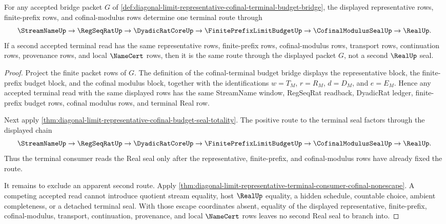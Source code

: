 \begin{theorem}
\label{thm:diagonal-limit-representative-cofinal-terminal-route-determinacy}
For any accepted bridge packet $G$ of \autoref{def:diagonal-limit-representative-cofinal-terminal-budget-bridge}, the displayed representative rows, finite-prefix rows, and cofinal-modulus rows determine one terminal route through
$$
\StreamNameUp \to \RegSeqRatUp \to \DyadicRatCoreUp \to \FinitePrefixLimitBudgetUp \to \CofinalModulusSealUp \to \RealUp.
$$
If a second accepted terminal read has the same representative rows, finite-prefix rows, cofinal-modulus rows, transport rows, continuation rows, provenance rows, and local $\NameCert$ rows, then it is the same route through the displayed packet $G$, not a second $\RealUp$ seal.
\end{theorem}
\begin{proof}
Project the finite packet rows of $G$. The definition of the cofinal-terminal budget bridge displays the representative block, the finite-prefix budget block, and the cofinal modulus block, together with the identifications $w=T_M$, $r=R_M$, $d=D_M$, and $e=E_M$. Hence any accepted terminal read with the same displayed rows has the same StreamName window, RegSeqRat readback, DyadicRat ledger, finite-prefix budget rows, cofinal modulus rows, and terminal Real row.

Next apply \autoref{thm:diagonal-limit-representative-cofinal-budget-seal-totality}. The positive route to the terminal seal factors through the displayed chain
$$
\StreamNameUp \to \RegSeqRatUp \to \DyadicRatCoreUp \to \FinitePrefixLimitBudgetUp \to \CofinalModulusSealUp \to \RealUp.
$$
Thus the terminal consumer reads the Real seal only after the representative, finite-prefix, and cofinal-modulus rows have already fixed the route.

It remains to exclude an apparent second route. Apply \autoref{thm:diagonal-limit-representative-terminal-consumer-cofinal-nonescape}. A competing accepted read cannot introduce quotient stream equality, host $\RealUp$ equality, a hidden schedule, countable choice, ambient completeness, or a detached terminal seal. With those escape coordinates absent, equality of the displayed representative, finite-prefix, cofinal-modulus, transport, continuation, provenance, and local $\NameCert$ rows leaves no second Real seal to branch into.
\end{proof}
